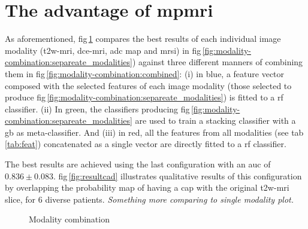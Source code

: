 \documentclass[a4paper,num-refs]{wiley-article}
\begin{document}
\section{The advantage of mpmri}%
\label{sec:experiments:mpmri-comparison}

As aforementioned, \ac{fig}\,\ref{fig:modality-combination} compares the best
results of each individual image modality (\ac{t2w}-\ac{mri}, \ac{dce}-\ac{mri},
\ac{adc} map and \ac{mrsi}) in 
\ac{fig}\,\ref{fig:modality-combination:separeate_modalities}) against three
different manners of combining them in \ac{fig}\,\ref{fig:modality-combination:combined}:
(i) in blue, a feature vector composed with the selected features of each image
modality (those selected to produce
\Ac{fig}\,\ref{fig:modality-combination:separeate_modalities}) is fitted to a
\ac{rf} classifier.
(ii) In green, the classifiers producing
\Ac{fig}\,\ref{fig:modality-combination:separeate_modalities} are used to train
a stacking classifier with a \ac{gb} as meta-classifier.
And (iii) in red, all the features from all modalities (see
\Ac{tab}\,\ref{tab:feat}) concatenated as a single vector are directly fitted to
a \ac{rf} classifier.

The best results are achieved using the last configuration with an \ac{auc} of
$0.836 \pm 0.083$.
\Acl{fig}\,\ref{fig:resultcad} illustrates qualitative results of this
configuration by overlapping the probability map of having a \ac{cap} with the
original \ac{t2w}-\ac{mri} slice, for 6 diverse patients.
\emph{Something more comparing to single modality plot.}

\begin{figure}
  \hspace*{\fill}
  \hfill
  \hspace*{\fill}
  \caption[modality combination] {Modality combination}
  \label{fig:modality-combination}
\end{figure}
\end{document}
